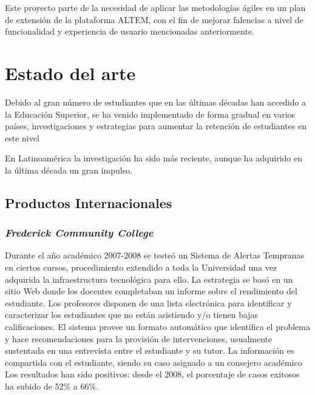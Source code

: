 Este proyecto parte de la necesidad de aplicar las metodologías ágiles en un plan de extensión de la plataforma ALTEM, con el fin de mejorar falencias a nivel de funcionalidad y experiencia de usuario mencionadas anteriormente.

\section{Estado del arte}
 Debido al gran número de estudiantes que en las últimas décadas han accedido a la Educación Superior, se ha venido implementado de forma gradual en varios países, investigaciones y estrategias para aumentar la retención de estudiantes en este nivel\cite{garinsallan}

 En Latinoamérica la investigación ha sido más reciente, aunque ha adquirido en la última década un gran impulso.\cite{SATPaper}

\subsection{Productos Internacionales}

 \subsubsection{\textit{Frederick Community College}}
 Durante el año académico 2007-2008 se testeó un Sistema de Alertas Tempranas en ciertos cursos, procedimiento extendido a toda la Universidad una vez adquirida la infraestructura tecnológica para ello. La estrategia se basó en un sitio Web donde los docentes completaban un informe sobre el rendimiento del estudiante. Los profesores disponen de una lista electrónica para identificar y caracterizar los estudiantes que no están asistiendo y/o tienen bajas calificaciones. El sistema provee un formato automático que identifica el problema y hace recomendaciones para la provisión de intervenciones, usualmente sustentada en una entrevista entre el estudiante y su tutor. La información es compartida con el estudiante, siendo su caso asignado a un consejero académico \cite{chapellc} 
 Los resultados han sido positivos: desde el 2008, el porcentaje de casos exitosos ha subido de 52\% a 66\%.
 
